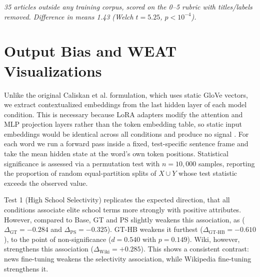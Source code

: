 \documentclass[11pt]{article}
\begin{document}
\begin{table}[htbp]
  \centering
  \small
  \caption{Style / Substance Probe: Haiku scores by group}
  \label{tab:style_probe}
  \vspace{4pt}

  {\small\textit{35 articles outside any training corpus, scored on the 0--5 rubric with titles/labels removed. Difference in means 1.43 (Welch $t=5.25$, $p<10^{-4}$).}}
\end{table}

\section{Output Bias and WEAT Visualizations}
\label{app:weat_viz}

Unlike the original Caliskan et al. formulation, which uses static GloVe vectors, we extract contextualized embeddings from the last hidden layer of each model condition.
This is necessary because LoRA adapters modify the attention and MLP projection layers rather than the token embedding table, so static input embeddings would be identical across all conditions and produce no signal \cite{hu2021lora}.
For each word we run a forward pass inside a fixed, test-specific sentence frame and take the mean hidden state at the word's own token positions.
Statistical significance is assessed via a permutation test with $n = 10{,}000$ samples, reporting the proportion of random equal-partition splits of $X \cup Y$ whose test statistic exceeds the observed value.

Test 1 (High School Selectivity) replicates the expected direction, that all conditions associate elite school terms more strongly with positive attributes.
However, compared to Base, GT and PS slightly weakens this association, as ($\Delta_{\text{GT}} = -0.284$ and $\Delta_{\text{PS}} = -0.325$).
GT-HB weakens it furthest ($\Delta_{\text{GT-HB}} = -0.610$), to the point of non-significance ($d = 0.540$ with $p = 0.149$).
Wiki, however, strengthens this association ($\Delta_{\text{Wiki}} = +0.285$).
This shows a consistent contrast: news fine-tuning weakens the selectivity association, while Wikipedia fine-tuning strengthens it.
\end{document}
